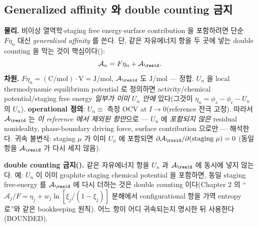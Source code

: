 \subsection{Generalized affinity 와 double counting 금지}\label{sec:ch3_genaff}
\textbf{물리.} 비이상 열역학$\cdot$staging free energy$\cdot$surface contribution 을 포함하려면 단순 $F\eta_n$
대신 \emph{generalized affinity} 를 쓴다. 단, 같은 자유에너지 항을 두 곳에 넣는 double counting 을 막는 것이
핵심이다():
\begin{equation}
\mathcal A_n=F\eta_n+\mathcal A_{\resid}.
\label{eq:ch3_genaff}
\end{equation}
\textbf{차원.} $F\eta_n=\mathrm{(C/mol)\cdot V}=\mathrm{J/mol}$, $\mathcal A_{\resid}$ 도 $\mathrm{J/mol}$ — 정합.
$U_n$ 을 local thermodynamic equilibrium potential 로 정의하면 activity/chemical potential/staging free energy
\emph{일부가 이미 $U_n$ 안에} 있다(그것이 $\eta_n=\phi_s-\phi_e-U_n$ 의 $U_n$). \textbf{operational 정의}:
$U_n\equiv$ 측정 OCV at $I\to0$(reference 전극 고정). 따라서 $\mathcal A_{\resid}$ 는 \emph{이 reference 에서 제외된
항만}으로 — $U_n$ 에 \emph{포함되지 않은} residual nonideality, phase-boundary driving force, surface contribution
으로만 — 해석한다. 귀속 불변식: staging $\mu$ 가 이미 $U_n$ 에 포함되면 $\partial\mathcal A_{\resid}/\partial(\text{staging }\mu)=0$
(동일 항을 $\mathcal A_{\resid}$ 가 다시 세지 않음).
\begin{boundbox}
\textbf{double counting 금지().} 같은 자유에너지 항을 $U_n$ 과 $\mathcal A_{\resid}$ 에 동시에 넣지
않는다. 예: $U_n$ 이 이미 graphite staging chemical potential 을 포함하면, 동일 staging free-energy 를
$\mathcal A_{\resid}$ 에 다시 더하는 것은 double counting 이다(Chapter 2 의 ``$\mathcal A_j/F=\eta_j+w_j\ln[\xi_j/(1-\xi_j)]$
분해에서 configurational 항을 가역 entropy 로''와 같은 bookkeeping 원칙). 어느 항이 어디 귀속되는지 명시한 뒤
사용한다(BOUNDED).
\end{boundbox}

